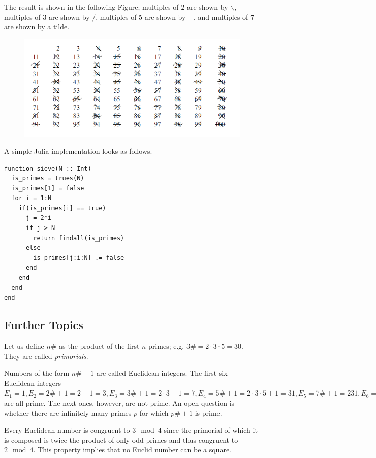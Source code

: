 The result is shown in the following Figure; multiples of $2$ are shown by $\backslash$, multiples of $3$ are shown by $/$, multiples of $5$ are shown by $-$, and multiples of $7$ are shown by a tilde.

\begin{figure}[H]
    \centering
    \includegraphics[scale=0.75]{images/primes_01_01.png}
\end{figure}


A simple Julia implementation looks as follows.

\begin{verbatim}
function sieve(N :: Int)
  is_primes = trues(N)
  is_primes[1] = false
  for i = 1:N
    if(is_primes[i] == true)
      j = 2*i
      if j > N
        return findall(is_primes)
      else
        is_primes[j:i:N] .= false
      end
    end
  end
end
\end{verbatim}


\subsection{Further Topics}

Let us define $n \#$ as the product of the first $n$ primes; e.g. $3 \# = 2 \cdot 3 \cdot 5 = 30$. They are called \emph{primorials}.

Numbers of the form $n \# + 1$ are called Euclidean integers. The first six Euclidean integers $E_1 = 1, E_2 = 2 \# + 1= 2 + 1 = 3, E_3 = 3 \# + 1 = 2 \cdot 3 + 1 = 7, E_4 = 5 \# + 1 = 2 \cdot 3 \cdot 5 + 1 = 31, E_5 = 7 \# + 1 = 231, E_6 = 11 \# + 1 = 2311$ are all prime. The next ones, however, are not prime. An open question is whether there are infinitely many primes $p$ for which $p \# + 1$ is prime.

Every Euclidean number is congruent to $3 \mod 4$ since the primorial of which it is composed is twice the product of only odd primes and thus congruent to $2 \mod 4$. This property implies that no Euclid number can be a square. 

